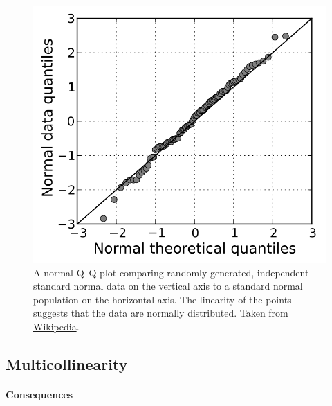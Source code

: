 \documentclass[]{article}
\begin{document}
\begin{figure}[H]
\center \includegraphics[scale=0.25]{qq_plot_example}
\caption{A normal Q–Q plot comparing randomly generated, independent standard normal data on the vertical axis to a standard normal population on the horizontal axis. The linearity of the points suggests that the data are normally distributed. Taken from \href{https://en.wikipedia.org/wiki/Q\%E2\%80\%93Q_plot}{Wikipedia}.}
\end{figure}

\subsection{Multicollinearity}

\paragraph{Consequences}
\end{document}
